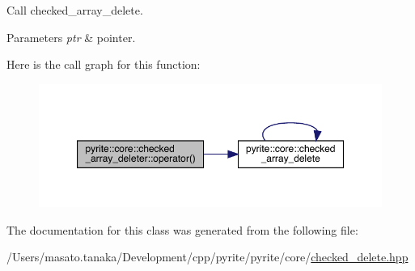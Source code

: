 Call checked\+\_\+array\+\_\+delete. 
\begin{DoxyParams}{Parameters}
{\em ptr} & pointer. \\
\hline
\end{DoxyParams}
Here is the call graph for this function\+:
\nopagebreak
\begin{figure}[H]
\begin{center}
\leavevmode
\includegraphics[width=350pt]{dc/dd4/classpyrite_1_1core_1_1checked__array__deleter_a9ac9321cdd986f83350ab5707f9ed4b4_cgraph}
\end{center}
\end{figure}


The documentation for this class was generated from the following file\+:\begin{DoxyCompactItemize}
\item 
/\+Users/masato.\+tanaka/\+Development/cpp/pyrite/pyrite/core/\mbox{\hyperlink{checked__delete_8hpp}{checked\+\_\+delete.\+hpp}}\end{DoxyCompactItemize}
